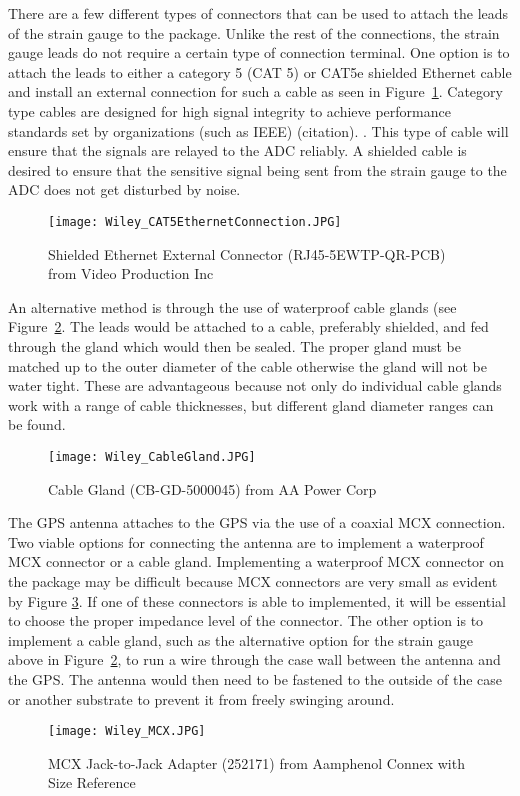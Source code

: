 There are a few different types of connectors that can be used to attach the leads of the strain gauge to the package.  Unlike the rest of the
connections, the strain gauge leads do not require a certain type of connection terminal.  One option is to attach the leads to either a category 5 (CAT
5) or CAT5e shielded Ethernet cable and install an external connection for such a cable as seen in Figure~\ref{fig:CAT5}.  Category type cables are
designed for high signal integrity to achieve performance standards set by organizations (such as IEEE) (citation).  .  This type of cable will ensure that the signals are relayed to the ADC reliably.  A shielded cable is desired to
ensure that the sensitive signal being sent from the strain gauge to the ADC does not get disturbed by noise.  
\begin{figure}[h]
\centering
\texttt{[image: Wiley\_CAT5EthernetConnection.JPG]}
\caption{\label{fig:CAT5} Shielded Ethernet External Connector (RJ45-5EWTP-QR-PCB) from Video Production Inc}
\end{figure}

An alternative method is through the use of waterproof cable glands (see Figure~\ref{fig:Cable Gland}.  The leads would be attached to a cable, preferably
shielded, and fed through the gland which would then be sealed.  The proper gland must be matched up to the outer diameter of the cable otherwise the
gland will not be water tight. These are advantageous because not only do individual cable glands work with a range of cable thicknesses, but different
gland diameter ranges can be found.  
\begin{figure}[ht]
\centering
\texttt{[image: Wiley\_CableGland.JPG]}
\caption{\label{fig:Cable Gland} Cable Gland (CB-GD-5000045) from AA Power Corp}
\end{figure}


The GPS antenna attaches to the GPS via the use of a coaxial MCX connection.  Two viable options for connecting the antenna are to implement a waterproof
MCX connector or a cable gland.  Implementing a waterproof MCX connector on the package may be difficult because MCX connectors are very small as evident
by Figure \ref{fig:MCX}.  If one of these connectors is able to implemented, it will be essential to choose the proper impedance level of the
connector.  The other option is to implement a cable gland, such as the alternative option for the strain gauge above in Figure~\ref{fig:Cable Gland},
to run a wire through the case wall between the antenna and the GPS.  The antenna would then need to be fastened to the outside of the case or another
substrate to prevent it from freely swinging around.  
\begin{figure}[ht]
\centering
\texttt{[image: Wiley\_MCX.JPG]}
\caption{\label{fig:MCX} MCX Jack-to-Jack Adapter (252171) from Aamphenol Connex with Size Reference}
\end{figure}


